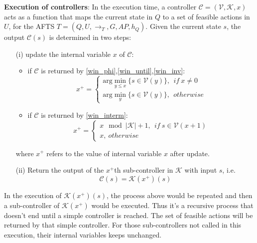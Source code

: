 \begin{definition} \textbf{Execution of controllers}:
In the execution time, a controller $ \mathcal{C}=(\mathcal{V},\mathcal{K},x) $ acts as a function that maps the current state in $ Q $ to a set of feasible actions in $ U $, for the AFTS $ T = (Q,U,\rightarrow_T, G,AP,h_Q)$. Given the current state $ s $, the output $ \mathcal{C}(s) $ is determined in two steps:
\begin{itemize}
	\item[(i)] update the internal variable $ x $ of $ \mathcal{C} $: 
	\begin{itemize}
		\item 	if $ \mathcal{C} $ is returned by \eqref{win_phi},\eqref{win_until},\eqref{win_inv}:
		\begin{displaymath}
		x^+ =	\begin{cases}
		\text{arg}\min_{y\leq x}\{s\in \mathcal{V}(y)\},\ \ if\ x\not=0\\
		\text{arg}\min_{y}\{s\in \mathcal{V}(y)\},\ \ otherwise
		\end{cases}
		\end{displaymath}
		\item  if $ \mathcal{C} $ is returned by \eqref{win_interm}:
		\begin{displaymath}
		x^+ = \begin{cases}
		x\mod\vert\mathcal{K}\vert + 1,\ \ if\ s\in \mathcal{V}(x+1)\\
		x,\ otherwise
		\end{cases}
		\end{displaymath}
	\end{itemize}
	where $ x^+ $ refers to the value of internal variable $ x $ after update.

	\item[(ii)] Return the output of the $ x^+ $th sub-controller in $ \mathcal{K} $ with input $ s $, i.e.
	\begin{displaymath}
	\mathcal{C}(s) = \mathcal{K}(x^+)(s)
	\end{displaymath}
\end{itemize}
	
	In the execution of $ \mathcal{K}(x^+)(s) $, the process above would be repeated and then a sub-controller of $ \mathcal{K}(x^+) $ would be executed. Thus it's a recursive process that doesn't end until a simple controller is reached.
	The set of feasible actions will be returned by that simple controller. For those sub-controllers not called in this execution, their internal variables keeps unchanged.
	

	\label{def:exec}
\end{definition}
